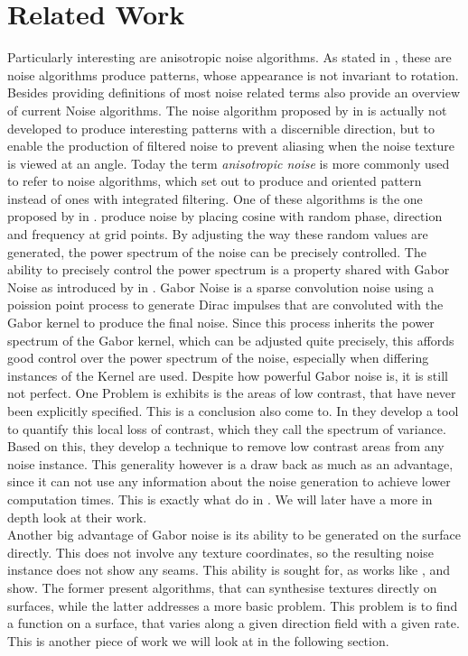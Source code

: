 \documentclass{utue} %
\begin{document}
\section{Related Work}
Particularly interesting are anisotropic noise algorithms. As stated in \cite{survey}, these are noise algorithms produce patterns, whose appearance is not invariant to rotation. Besides providing definitions of most noise related terms \citeauthor{survey} also provide an overview of current Noise algorithms. The noise algorithm proposed by \citeauthor{anisotropicNoise} in \cite{anisotropicNoise} is actually not developed to produce interesting patterns with a discernible direction, but to enable the production of filtered noise to prevent aliasing when the noise texture is viewed at an angle. Today the term \textit{anisotropic noise} is more commonly used to refer to noise algorithms, which set out to produce and oriented pattern instead of ones with integrated filtering. One of these algorithms is the one proposed by \citeauthor{randomPhaseNoise} in \cite{randomPhaseNoise}. \citeauthor{randomPhaseNoise} produce noise by placing cosine with random phase, direction and frequency at grid points. By adjusting the way these random values are generated, the power spectrum of the noise can be precisely controlled. The ability to precisely control the power spectrum is a property shared with Gabor Noise as introduced by \citeauthor{gaborNoise} in \cite{gaborNoise}. Gabor Noise is a sparse convolution noise using a poission point process to generate Dirac impulses that are convoluted with the Gabor kernel to produce the final noise. Since this process inherits the power spectrum of the Gabor kernel, which can be adjusted quite precisely, this affords good control over the power spectrum of the noise, especially when differing instances of the Kernel are used. Despite how powerful Gabor noise is, it is still not perfect. One Problem is exhibits is the areas of low contrast, that have never been explicitly specified. This is a conclusion \citeauthor{spectrumOfVariance} also come to. In \cite{spectrumOfVariance} they develop a tool to quantify this local loss of contrast, which they call the spectrum of variance. Based on this, they develop a technique to remove low contrast areas from any noise instance. This generality however is a draw back as much as an advantage, since it can not use any information about the noise generation to achieve lower computation times. This is exactly what \citeauthor{phasorNoise} do in \cite{phasorNoise}. We will later have a more in depth look at their work.\\
Another big advantage of Gabor noise is its ability to be generated on the surface directly. This does not involve any texture coordinates, so the resulting noise instance does not show any seams. This ability is sought for, as works like \cite{appearanceTextureSynthesis}, \cite{textureSynthesis} and \cite{stripes} show. The former present algorithms, that can synthesise textures directly on surfaces, while the latter addresses a more basic problem. This problem is to find a function on a surface, that varies along a given direction field with a given rate. This is another piece of work we will look at in the following section.
\end{document}
